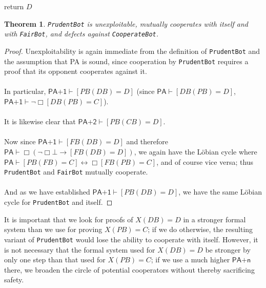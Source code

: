 \documentclass[12pt, letterpaper]{article}
\newtheorem{theorem}{Theorem}[section]
\numberwithin{equation}{section}
\newenvironment{remark}[1][Remark]{\begin{trivlist}
\item[\hskip \labelsep {\bfseries #1}]}{\end{trivlist}}
\begin{document}
\begin{algorithm}[H]
\label{PrudentBot}

  return $D$\;
 \caption{\texttt{PrudentBot (PB)}}
\end{algorithm}
\begin{theorem}
\label{PrudentRocks}
\texttt{PrudentBot} is unexploitable, mutually cooperates with itself and with \texttt{FairBot}, and defects against \texttt{CooperateBot}.
\end{theorem}
\begin{proof}
Unexploitability is again immediate from the definition of \texttt{PrudentBot} and the assumption that \textsf{PA} is sound, since cooperation by \texttt{PrudentBot} requires a proof that its opponent cooperates against it.\\
\\
In particular, $\textsf{PA+1}\vdash [PB(DB)=D]$ (since $\textsf{PA}\vdash [DB(PB)=D]$, $\textsf{PA+1}\vdash \neg \Box[DB(PB)=C]$).\\
\\ 
It is likewise clear that $\textsf{PA+2}\vdash [PB(CB)=D]$.\\
\\
Now since $\textsf{PA+1}\vdash [FB(DB)=D]$ and therefore $\textsf{PA}\vdash\Box(\neg\Box\bot\to[FB(DB)=D])$, we again have the L\"{o}bian cycle where $\textsf{PA}\vdash[PB(FB)=C]\leftrightarrow \Box[FB(PB)=C]$, and of course vice versa; thus \texttt{PrudentBot} and \texttt{FairBot} mutually cooperate.
\\
\\ And as we have established $\textsf{PA+1}\vdash [PB(DB)=D]$, we have the same L\"{o}bian cycle for \texttt{PrudentBot} and itself.
\end{proof}

\begin{remark}
It is important that we look for proofs of $X(DB)=D$ in a stronger formal system than we use for proving $X(PB)=C$; if we do otherwise, the resulting variant of \texttt{PrudentBot} would lose the ability to cooperate with itself. However, it is not necessary that the formal system used for $X(DB)=D$ be stronger by only one step than that used for $X(PB)=C$; if we use a much higher $\textsf{PA+n}$ there, we broaden the circle of potential cooperators without thereby sacrificing safety.
\end{remark}
\end{document}
